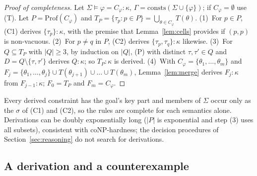 \documentclass[conference]{IEEEtran}
\theoremstyle{definition}
\newcommand{\Sig}{\Sigma}
\newcommand{\Prof}{\mathrm{Prof}}
\newcommand{\consts}{\mathrm{consts}}
\begin{document}
\begin{proof}[Proof of completeness]
Let $\Sig\models\varphi=C_\varphi:\kappa$, $\Gamma=\consts(\Sig\cup\{\varphi\})$; if $C_\varphi=\emptyset$ use (T).
Let $P=\Prof(C_\varphi)$ and $T_P=\{\tau_p:p\in P\}=\bigcup_{\theta\in C_\varphi}T(\theta)$.
(1)~For $p\in P$, (C1) derives $\{\tau_p\}:\kappa$, with the premise that Lemma~\ref{lem:cells}
provides if $(p,p)$ is non-vacuous. (2)~For $p\neq q$ in $P$, (C2) derives
$\{\tau_p,\tau_q\}:\kappa$ likewise. (3)~For $Q\subseteq T_P$ with $|Q|\ge3$, by induction on $|Q|$, (P)
with distinct $\tau,\tau'\in Q$ and $D=Q\setminus\{\tau,\tau'\}$ derives $Q:\kappa$; so $T_P:\kappa$ is
derived. (4)~With $C_\varphi=\{\theta_1,\dots,\theta_m\}$ and
$F_j=\{\theta_1,\dots,\theta_j\}\cup T(\theta_{j+1})\cup\dots\cup T(\theta_m)$, Lemma~\ref{lem:merge}
derives $F_j:\kappa$ from $F_{j-1}:\kappa$; $F_0=T_P$ and $F_m=C_\varphi$.
\end{proof}

Every derived constraint has the goal's key part and members of $\Sig$ occur only as the $\sigma$ of
(C1) and (C2), so the rules are complete for each semantics alone. Derivations can be doubly
exponentially long ($|P|$ is exponential and step (3) uses all subsets), consistent with
coNP-hardness; the decision procedures of Section~\ref{sec:reasoning} do not search for
derivations.

\subsection{A derivation and a counterexample}
\end{document}
